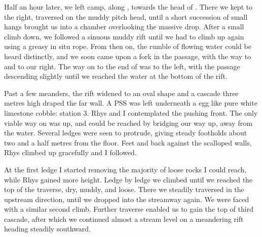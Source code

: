 Half an hour later, we left camp, along , towards the head of . There we kept to the right, traversed on the muddy pitch head, until a short succession of small hangs brought us into a chamber overlooking the massive drop. After a small climb down, we followed a sinuous muddy rift until we had to climb up again using a greasy in situ rope. From then on, the rumble of flowing water could be heard distinctly, and we soon came upon a fork in the passage, with the way to  and  to our right. The way on to the end of  was to the left, with the passage descending slightly until we reached the water at the bottom of the rift.


Past a few meanders, the rift widened to an oval shape and a cascade three metres high draped the far wall. A PSS was left underneath a egg like pure white limestone cobble:  station 3. Rhys and I contemplated the pushing front. The only viable way on was up, and could be reached by bridging our way up, away from the water. Several ledges were seen to protrude, giving steady footholds about two and a half metres from the floor. Feet and back against the scalloped walls, Rhys  climbed up gracefully and I followed.

At the first ledge I started removing the majority of loose rocks I could reach, while Rhys gained more height. Ledge by ledge we climbed until we reached the top of the traverse, dry, muddy, and loose. There we steadily traversed in the upstream direction, until we dropped into the streamway again. We were faced with a similar second climb. Further traverse enabled us to gain the top of third cascade, after which we continued almost a stream level on a meandering rift heading steadily southward.

